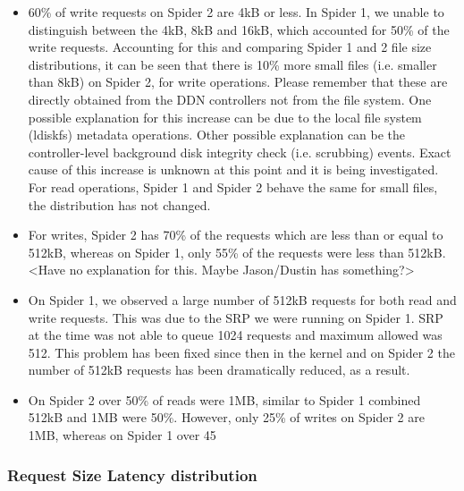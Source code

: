 \begin{itemize}

\item  60\% of write requests on Spider 2 are 4kB or less.  In Spider 1, we
unable to distinguish between the 4kB, 8kB and 16kB, which accounted for 50\%
of the write requests. Accounting for this and comparing Spider 1 and 2 file
size distributions, it can be seen that there is 10\% more small files (i.e.
smaller than 8kB) on Spider 2, for write operations. Please remember that these
are directly obtained from the DDN controllers not from the file system. One
possible explanation for this increase can be due to the local file system
(ldiskfs) metadata operations. Other possible explanation can be the
controller-level background disk integrity check (i.e. scrubbing) events. Exact
cause of this increase is unknown at this point and it is being investigated.
For read operations, Spider 1 and Spider 2 behave the same for small files, the
distribution has not changed.

\item  For writes, Spider 2 has 70\% of the requests which are less than or
equal to 512kB, whereas on Spider 1, only 55\% of the requests were less than
512kB. <Have no explanation for this. Maybe Jason/Dustin has something?> 

\item   On Spider 1, we observed a large number of 512kB requests for both read
and write requests. This was due to the SRP we were running on Spider 1. SRP at
the time was not able to queue 1024 requests and maximum allowed was 512. This
problem has been fixed since then in the kernel and on Spider 2 the number of
512kB requests has been dramatically reduced, as a result.

\item On Spider 2 over 50\% of reads were 1MB, similar to Spider 1 combined
512kB and 1MB were 50\%. However, only 25\% of writes on Spider 2 are 1MB,
whereas on Spider 1 over 45%

\end{itemize}


\subsubsection{Request Size Latency distribution}

